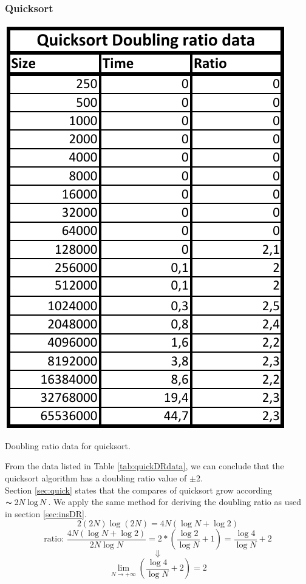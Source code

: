 \documentclass[pdftex,11pt,a4paper,english,titlepage]{article}
\begin{document}
		\subsubsection{Quicksort}
\begin{table}[H]
	\centering
	\includegraphics[scale=1]{quickDRdata.pdf}
	\caption{Doubling ratio data for quicksort.\label{tab:quickDRdata}}
\end{table}

From the data listed in Table \ref{tab:quickDRdata}, we can conclude that the quicksort algorithm has a doubling ratio value of $\pm$2.\\

Section \ref{sec:quick} states that the compares of quicksort grow according $\thicksim 2N\log N$. We apply the same method for deriving the doubling ratio as used in section \ref{sec:insDR}. $$2(2N)\log (2N)=4N(\log N + \log 2)$$
$$\text{ratio: } \frac{4N(\log N + \log 2)}{2N\log N} = 2*(\frac{\log 2}{\log N} + 1)= \frac{\log 4}{\log N}+2$$
$$\Downarrow$$  
$$\lim_{N \to +\infty}(\frac{\log 4}{\log N}+2) = 2$$
\end{document}
